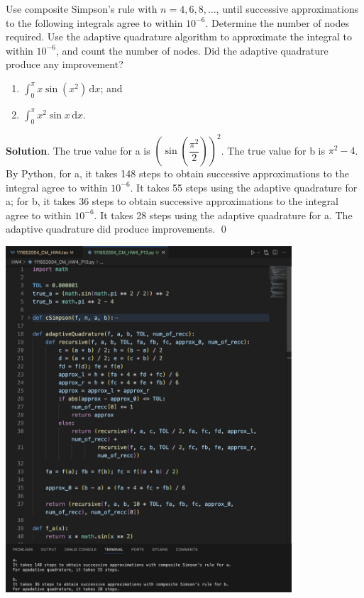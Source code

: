 \documentclass[11pt]{article}
\theoremstyle{break}
\newcommand{\ddi}{\text{$\,$d}}
\numberwithin{equation}{theorem}
\begin{document}
\newpage
\begin{problem}\label{problem 13} %
    Use composite Simpson's rule with $n=4, 6, 8,\dots$, until successive approximations to the following integrals agree to within $10^{-6}$. Determine the number of nodes required. Use the adaptive quadrature algorithm to approximate the integral to within $10^{-6}$, and count the number of nodes. Did the adaptive quadrature produce any improvement? \vspace{-1em}
    \begin{multicols}{2}
        \begin{enumerate}
            \item $\displaystyle\int_{0}^{\pi}x\sin(x^2)\ddi x$; and
            \item $\displaystyle\int_{0}^{\pi}x^2\sin x\ddi x$.
        \end{enumerate}
    \end{multicols}
    \vspace{0.1em}
\end{problem}
\textbf{Solution}. The true value for a is $\left(\sin\left(\dfrac{\pi^2}{2}\right)\right)^2$. The true value for b is $\pi^2-4$. By Python, for a, it takes 148 steps to obtain successive approximations to the integral agree to within $10^{-6}$. It takes 55 steps using the adaptive quadrature for a; for b, it takes 36 steps to obtain successive approximations to the integral agree to within $10^{-6}$. It takes 28 steps using the adaptive quadrature for a. The adaptive quadrature did produce improvements. \qed

\begin{center}
    \includegraphics[width=0.8\textwidth]{P13.jpg}
\end{center}
\end{document}
